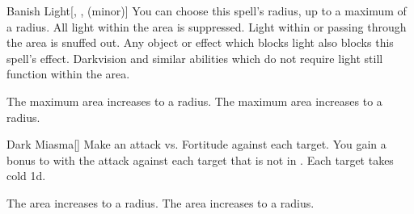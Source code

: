 \lowercase{\hypertarget{spell:Banish Light}{}}\label{spell:Banish Light}
\begin{freeability}[Rank 3]{\hypertarget{spell:Banish Light}{Banish Light}}[, ,  (minor)]
You can choose this spell's radius, up to a maximum of a \areamed radius.
All light within the area is suppressed.
Light within or passing through the area is snuffed out.
Any object or effect which blocks light also blocks this spell's effect.
Darkvision and similar abilities which do not require light still function within the area.

\rankline
{} The maximum area increases to a \arealarge radius.
 The maximum area increases to a \areaext radius.
\end{freeability}
\vspace{0.25em}



\lowercase{\hypertarget{spell:Dark Miasma}{}}\label{spell:Dark Miasma}
\begin{freeability}[Rank 3]{\hypertarget{spell:Dark Miasma}{Dark Miasma}}[]
Make an attack vs. Fortitude against each target.
You gain a  bonus to  with the attack against each target that is not in .
\hit Each target takes cold  \minus1d.

\rankline
{} The area increases to a \areamed radius.
 The area increases to a \arealarge radius.
\end{freeability}
\vspace{0.25em}




